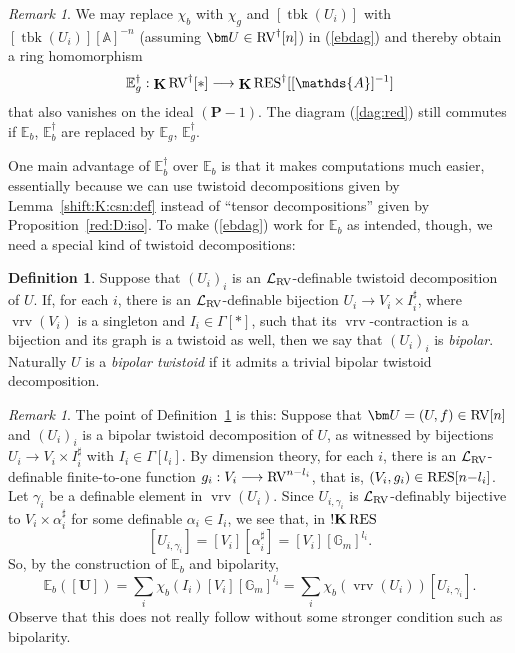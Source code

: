 \documentclass[12pt]{amsart}
\newcommand{\memph}[1]{{\color{magenta}\emph{#1}}}
\theoremstyle{plain}
\theoremstyle{definition}
\newtheorem{defn}[thm]{Definition}
\theoremstyle{remark}
\newtheorem{rem}[thm]{Remark}
\numberwithin{equation}{section}
\theoremstyle{plain}
\newcommand{\RV}{\textup{RV}}
\newcommand{\A}{\mathds{A}}
\newcommand{\G}{\mathds{G}}
\newcommand{\0}{\emptyset}
\newcommand{\lan}[3]{\mathcal{L}_{#1 \textup{#2} #3}}
\newcommand{\bb}[1]{\mathbb{#1}}
\newcommand{\fun}{\longrightarrow}
\newcommand{\RES}{\textup{RES}}
\DeclareMathOperator{\ggk}{\mathbf{K}}
\DeclareMathOperator{\sggk}{!\mathbf{K}}
\DeclareMathOperator{\vrv}{vrv}
\DeclareMathOperator{\tbk}{tbk}
\begin{document}
\begin{rem}\label{dag:g}
We may replace $\chi_b$ with $\chi_g$ and $[\tbk(U_i)]$ with $[\tbk(U_i)][\A]^{-n}$ (assuming $\bm U \in \RV^\dag[n]$) in (\ref{ebdag}) and thereby obtain a ring homomorphism
\[
\bb E^\dag_g : \ggk \RV^\dag[*] \fun \ggk \RES^\dag[[\A]^{-1}]
\]
that also vanishes on the ideal $(\bm P - 1)$. The diagram (\ref{dag:red}) still commutes if $\bb E_b$, $\bb E^\dag_b$ are replaced by $\bb E_g$, $\bb E^\dag_g$.
\end{rem}

One main advantage of $\bb E^\dag_b$ over $\bb E_b$ is that it makes computations much easier, essentially because  we can use twistoid decompositions given by Lemma~\ref{shift:K:csn:def} instead of ``tensor decompositions'' given by Proposition~\ref{red:D:iso}. To make (\ref{ebdag}) work for $\bb E_b$ as intended, though, we need a special kind  of twistoid decompositions:

\begin{defn}\label{bipo:defn}
Suppose that $(U_i)_i$ is an $\lan{}{RV}{}$-definable twistoid decomposition of $U$.
If, for each $i$, there is an $\lan{}{RV}{}$-definable bijection $U_i \fun V_i \times I_i^\sharp$, where $\vrv(V_i)$ is a singleton and $I_i \in \Gamma[*]$, such that its $\vrv$-contraction is a bijection  and its graph is a twistoid as well, then we say that $(U_i)_i$ is  \memph{bipolar}. Naturally $U$ is a \memph{bipolar twistoid} if it admits a trivial bipolar twistoid decomposition.
\end{defn}


\begin{rem}\label{bipo:desc}
The point of Definition~\ref{bipo:defn} is this: Suppose that $\bm U = (U, f) \in \RV[n]$ and  $(U_i)_i$ is a bipolar twistoid decomposition of $U$, as witnessed by bijections $U_i \fun V_i \times I_i^\sharp$ with $I_i \in \Gamma[l_i]$. By dimension theory, for each $i$, there is an $\lan{}{RV}{}$-definable finite-to-one function $g_i: V_i \fun \RV^{n-l_i}$, that is, $(V_i, g_i) \in \RES[n{-}l_i]$. Let $\gamma_i$ be a definable element in $\vrv(U_i)$. Since $U_{i,\gamma_i}$ is $\lan{}{RV}{}$-definably bijective to $V_i \times \alpha_i^{\sharp}$ for some definable $\alpha_i \in I_i$, we see that, in $\sggk \RES$
\[
[U_{i,\gamma_i}] = [V_i] [\alpha_i^{\sharp}] = [V_i] [\G_m]^{l_i}.
\]
So,  by the construction of $\bb E_b$ and bipolarity,
\begin{equation}\label{Eb:twist:com}
\bb E_b([\bm U]) = \sum_i \chi_b(I_i)[V_i] [\G_m]^{l_i} = \sum_i \chi_b(\vrv(U_i))[U_{i,\gamma_i}].
\end{equation}
Observe that this does not really follow without some stronger condition such as bipolarity.
\end{rem}
\end{document}
